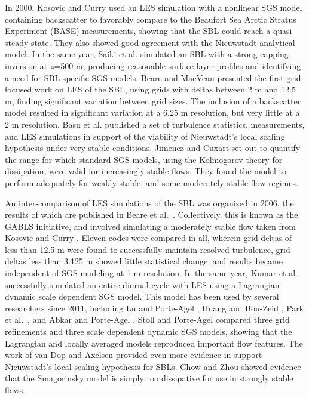 \documentclass[conf]{new-aiaa}
\begin{document}
In 2000, Kosovic and Curry \cite{Kosovic2000} used an LES simulation
with a nonlinear SGS model containing backscatter to favorably compare
to the Beaufort Sea Arctic Stratus Experiment (BASE) measurements,
showing that the SBL could reach a quasi steady-state. They also
showed good agreement with the Nieuwstadt analytical model. In the same
year, Saiki et al. \cite{Saiki2000} simulated an SBL with
a strong capping inversion at $z$=500 m, producing reasonable surface layer profiles and
identifying a need for SBL specific SGS models. Beare and MacVean \cite{Beare2004}
presented the first grid-focused work on LES of the SBL, using grids with deltas
between 2 m and 12.5 m, finding significant variation between grid sizes. The inclusion
of a backscatter model resulted in significant variation at a 6.25 m resolution, but
very little at a 2 m resolution. Basu et al. \cite{Basu2005} published a set of
turbulence statistics, measurements, and LES simulations in support
of the viability of Nieuwstadt's local scaling hypothesis under very stable
conditions. Jimenez and Cuxart \cite{Jimenez2005} set out to quantify the range
for which standard SGS models, using the Kolmogorov theory for dissipation, were
valid for increasingly stable flows. They found the model to perform adequately
for weakly stable, and some moderately stable flow regimes.

An inter-comparison of LES simulations of the SBL was organized in 2006, the
results of which are published in Beare et al.\ \cite{Beare2006}. Collectively,
this is known as the GABLS initiative, and involved simulating a moderately
stable flow taken from Kosovic and Curry \cite{Kosovic2000}. Eleven codes
were compared in all, wherein grid deltas of less than 12.5 m were found to
successfully maintain resolved turbulence, grid deltas less than 3.125 m
showed little statistical change, and results became independent of SGS
modeling at 1 m resolution. In the same year, Kumar et al. \cite{Kumar2006}
successfully simulated an entire diurnal cycle with LES using a Lagrangian
dynamic scale dependent SGS model. This model has been used by several
researchers since 2011, including Lu and Porte-Agel \cite{Lu2011}, Huang
and Bou-Zeid \cite{Huang2013}, Park et al.\ \cite{Park2014}, and
Abkar and Porte-Agel \cite{Abkar2015}. Stoll and Porte-Agel \cite{Stoll2007}
compared three grid refinements and three scale dependent dynamic SGS models,
showing that the Lagrangian and locally averaged models reproduced important
flow features. The work of van Dop and Axelsen \cite{vanDop2007} provided
even more evidence in support Nieuwstadt's local scaling hypothesis for SBLs.
Chow and Zhou \cite{Chow2011} showed evidence that the Smagorinsky model is
simply too dissipative for use in strongly stable flows.
\end{document}
